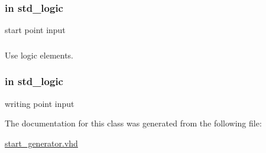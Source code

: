 \subsubsection[{\texorpdfstring{start\+\_\+point}{start_point}}]{ {\bfseries \textcolor{vhdlchar}{in}\textcolor{vhdlchar}{ }} {\bfseries \textcolor{vhdlchar}{std\+\_\+logic}\textcolor{vhdlchar}{ }} \hspace{0.3cm}{\ttfamily [Port]}}\hypertarget{classstart__generator_a3d23bfd08667d8c545bdbd9bf1048041}{}\label{classstart__generator_a3d23bfd08667d8c545bdbd9bf1048041}


start point input 

\subsubsection[{\texorpdfstring{std\+\_\+logic\+\_\+1164}{std_logic_1164}}]{\hspace{0.3cm}{\ttfamily [Package]}}\hypertarget{classstart__generator_acd03516902501cd1c7296a98e22c6fcb}{}\label{classstart__generator_acd03516902501cd1c7296a98e22c6fcb}


Use logic elements. 

\subsubsection[{\texorpdfstring{writing\+\_\+point}{writing_point}}]{ {\bfseries \textcolor{vhdlchar}{in}\textcolor{vhdlchar}{ }} {\bfseries \textcolor{vhdlchar}{std\+\_\+logic}\textcolor{vhdlchar}{ }} \hspace{0.3cm}{\ttfamily [Port]}}\hypertarget{classstart__generator_a12d6c9c482b5975efc30e34bb0951659}{}\label{classstart__generator_a12d6c9c482b5975efc30e34bb0951659}


writing point input 



The documentation for this class was generated from the following file\+:\begin{DoxyCompactItemize}
\item 
\hyperlink{start__generator_8vhd}{start\+\_\+generator.\+vhd}\end{DoxyCompactItemize}
